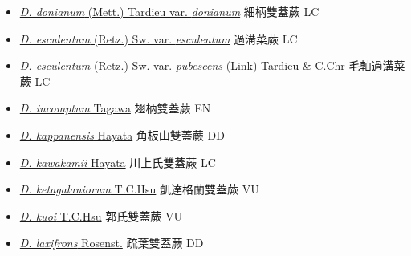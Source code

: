 \begin{itemize}
\begin{itemize}
        \item[] \href{http://www.theplantlist.org/tpl1.1/search?q=Diplazium+donianum+var.+donianum}{\textit{D. donianum} (Mett.) Tardieu var. \textit{donianum}}   細柄雙蓋蕨 LC
        \item[] \href{http://www.theplantlist.org/tpl1.1/search?q=Diplazium+esculentum+var.+esculentum}{\textit{D. esculentum} (Retz.) Sw. var. \textit{esculentum}}   過溝菜蕨 LC
        \item[] \href{http://www.theplantlist.org/tpl1.1/search?q=Diplazium+esculentum+var.+pubescens}{\textit{D. esculentum} (Retz.) Sw. var. \textit{pubescens} (Link) Tardieu \& C.Chr }   毛軸過溝菜蕨 LC
        \item[] \href{http://www.theplantlist.org/tpl1.1/search?q=Diplazium+incomptum}{\textit{D. incomptum} Tagawa}   翅柄雙蓋蕨 EN
        \item[] \href{http://www.theplantlist.org/tpl1.1/search?q=Diplazium+kappanensis}{\textit{D. kappanensis} Hayata}   角板山雙蓋蕨 DD
        \item[] \href{http://www.theplantlist.org/tpl1.1/search?q=Diplazium+kawakamii}{\textit{D. kawakamii} Hayata}   川上氏雙蓋蕨 LC
        \item[] \href{http://www.theplantlist.org/tpl1.1/search?q=Diplazium+ketagalaniorum}{\textit{D. ketagalaniorum} T.C.Hsu}   凱達格蘭雙蓋蕨 VU
        \item[] \href{http://www.theplantlist.org/tpl1.1/search?q=Diplazium+kuoi}{\textit{D. kuoi} T.C.Hsu}   郭氏雙蓋蕨 VU
        \item[] \href{http://www.theplantlist.org/tpl1.1/search?q=Diplazium+laxifrons}{\textit{D. laxifrons} Rosenst.}   疏葉雙蓋蕨 DD

\end{itemize}
\end{itemize}
